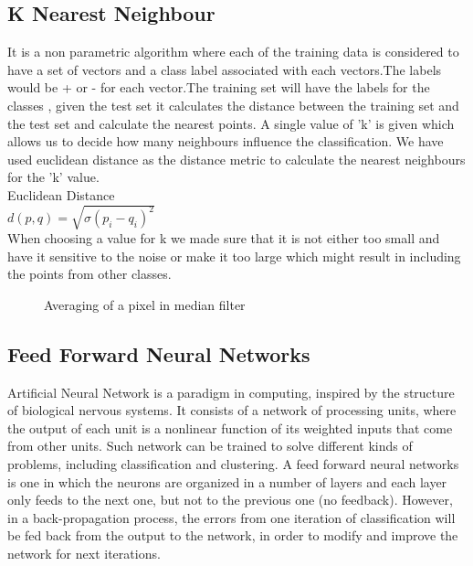 \documentclass[9pt,twocolumn,twoside]{../../styles/osajnl}
\begin{document}
\subsection {K Nearest Neighbour}
It is a non parametric algorithm where each of the training data is considered to have a set of vectors and a class label associated with each vectors.The labels would be + or - for each vector.The training set will have the labels for the classes , given the test set it calculates the distance between the training set and the test set and calculate the nearest points. A single value of 'k' is given which allows us to decide how many neighbours influence the classification. We have used euclidean distance as the distance metric to calculate the nearest neighbours for the 'k' value. \\
Euclidean Distance\\$ d(p,q) = \sqrt{ \sigma(p_i - q_i)^2}$\\
When choosing a value for k we made sure that it is not either too small and have it sensitive to the noise or make it too large which might result in including the points from other classes.

\begin{figure}
\centering
{}
\caption{Averaging of a pixel in median filter}\cite{steinbach-book}
\end{figure}

\subsection{Feed Forward Neural Networks}
Artificial Neural Network is a paradigm in computing, inspired by the
structure of biological nervous systems. It consists of a network of
processing units, where the output of each unit is a nonlinear
function of its weighted inputs that come from other units. Such
network can be trained to solve different kinds of problems, including
classification and clustering. A feed forward neural networks is one
in which the neurons are organized in a number of layers and each
layer only feeds to the next one, but not to the previous one (no
feedback). However, in a back-propagation process, the errors from one
iteration of classification will be fed back from the output to the
network, in order to modify and improve the network for next
iterations.
\end{document}
